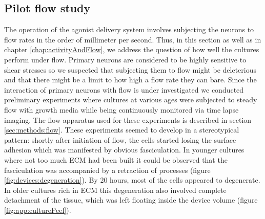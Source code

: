 \subsection{Pilot flow study}
    The operation of the agonist delivery system involves subjecting the neurons to flow rates in the order of millimeter per second. Thus, in this section as well as in chapter \ref{chap:activityAndFlow}, we address the question of how well the cultures perform under flow. Primary neurons are considered to be highly sensitive to shear stresses so we suspected that subjecting them to flow might be deleterious and that there might be a limit to how high a flow rate they can bare. Since the interaction of primary neurons with flow is under investigated we conducted preliminary experiments where cultures at various ages were subjected to steady flow with growth media while being continuously monitored via time lapse imaging. The flow apparatus used for these experiments is described in section \ref{sec:methods:flow}. These experiments seemed to develop in a stereotypical pattern: shortly after initiation of flow, the cells started losing the surface adhesion which was manifested by obvious fasciculation. In younger cultures where not too much ECM had been built it could be observed that the fasciculation was accompanied by a retraction of processes (figure \ref{fig:devices:degeneration}). By 20 hours, most of the cells appeared to degenerate. In older cultures rich in ECM this degeneration also involved complete detachment of the tissue, which was left floating inside the device volume (figure \ref{fig:app:culturePeel}).


